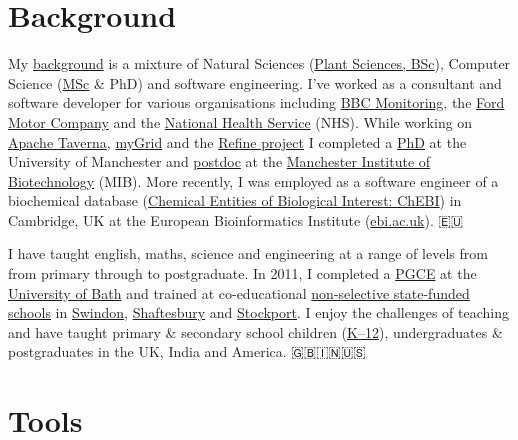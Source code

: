 \documentclass[12pt,]{book}
\begin{document}
\hypertarget{background}{%
\section*{Background}\label{background}}

My \href{https://uk.linkedin.com/in/duncanhull}{background} is a mixture of Natural Sciences (\href{http://www.plantsciences.manchester.ac.uk/}{Plant Sciences, BSc}), Computer Science (\href{http://www.cs.man.ac.uk/~hulld/msc2003.html}{MSc} \& PhD) and software engineering. I've worked as a consultant and software developer for various organisations including \href{https://en.wikipedia.org/wiki/BBC_Monitoring}{BBC Monitoring}, the \href{https://en.wikipedia.org/wiki/Ford_Motor_Company}{Ford Motor Company} and the \href{https://en.wikipedia.org/wiki/National_Health_Service}{National Health Service} (NHS). While working on \href{https://en.wikipedia.org/wiki/Apache_Taverna}{Apache Taverna}, \href{https://en.wikipedia.org/wiki/MyGrid}{myGrid} and the \href{http://www.nactem.ac.uk/pathtext/}{Refine project} I completed a \href{https://ethos.bl.uk/OrderDetails.do?uin=uk.bl.ethos.497578}{PhD} at the University of Manchester and \href{https://en.wikipedia.org/wiki/Postdoctoral_researcher}{postdoc} at the \href{http://www.mib.ac.uk/}{Manchester Institute of Biotechnology} (MIB). More recently, I was employed as a software engineer of a biochemical database (\href{https://www.ebi.ac.uk/chebi/}{Chemical Entities of Biological Interest: ChEBI}) in Cambridge, UK at the European Bioinformatics Institute (\href{https://www.ebi.ac.uk}{ebi.ac.uk}). 🇪🇺

I have taught english, maths, science and engineering at a range of levels from from primary through to postgraduate. In 2011, I completed a \href{https://en.wikipedia.org/wiki/Postgraduate_Certificate_in_Education}{PGCE} at the \href{https://www.bath.ac.uk/}{University of Bath} and trained at co-educational \href{https://en.wikipedia.org/wiki/State-funded_schools_(England)}{non-selective state-funded schools} in \href{https://www.lydiardparkacademy.org.uk/}{Swindon}, \href{https://shaftesburyschool.co.uk/}{Shaftesbury} and \href{https://www.st-annes.stockport.sch.uk/}{Stockport}. I enjoy the challenges of teaching and have taught primary \& secondary school children (\href{https://en.wikipedia.org/wiki/K\%E2\%80\%9312}{K--12}), undergraduates \& postgraduates in the UK, India and America. 🇬🇧🇮🇳🇺🇸

\hypertarget{tools}{%
\section*{Tools}\label{tools}}
\end{document}
